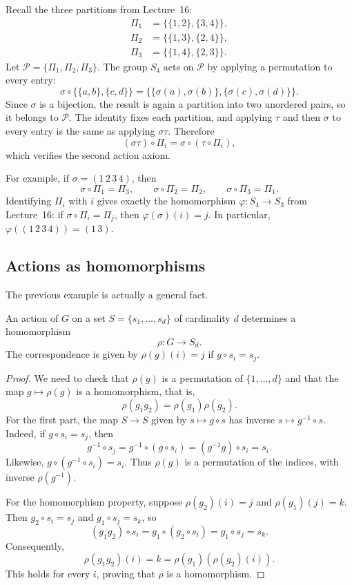 \documentclass[reqno,11pt]{amsart}
\begin{document}
\begin{example}
Recall the three partitions from Lecture~16:
\[
\begin{aligned}
  \Pi_1&=\bigl\{\{1,2\},\{3,4\}\bigr\},\\
  \Pi_2&=\bigl\{\{1,3\},\{2,4\}\bigr\},\\
  \Pi_3&=\bigl\{\{1,4\},\{2,3\}\bigr\}.
\end{aligned}
\]
Let $\mathcal P=\{\Pi_1,\Pi_2,\Pi_3\}$. The group $S_4$ acts on
$\mathcal P$ by applying a permutation to every entry:
\[
  \sigma\circ\bigl\{\{a,b\},\{c,d\}\bigr\}
  =\bigl\{\{\sigma(a),\sigma(b)\},
            \{\sigma(c),\sigma(d)\}\bigr\}.
\]
Since $\sigma$ is a bijection, the result is again a partition into
two unordered pairs, so it belongs to $\mathcal P$.
The identity fixes each partition, and applying $\tau$ and then
$\sigma$ to every entry is the same as applying $\sigma\tau$.
Therefore
\[
  (\sigma\tau)\circ\Pi_i=\sigma\circ(\tau\circ\Pi_i),
\]
which verifies the second action axiom.

For example, if $\sigma=(1\,2\,3\,4)$, then
\[
  \sigma\circ\Pi_1=\Pi_3,\qquad
  \sigma\circ\Pi_2=\Pi_2,\qquad
  \sigma\circ\Pi_3=\Pi_1.
\]
Identifying $\Pi_i$ with $i$ gives exactly the homomorphism
$\varphi:S_4\to S_3$ from Lecture~16: if
$\sigma\circ\Pi_i=\Pi_j$, then $\varphi(\sigma)(i)=j$.
In particular, $\varphi((1\,2\,3\,4))=(1\,3)$.
\end{example}


\subsection{Actions as homomorphisms}

The previous example is actually a general fact.

\begin{proposition}
An action of $G$ on a set $S=\{s_1,\ldots,s_d\}$ of cardinality $d$
determines a homomorphism
\[
  \rho:G\longrightarrow S_d.
\]
The correspondence is given by $\rho(g)(i)=j$ if $g\circ s_i=s_j$.
\end{proposition}
\begin{proof}
We need to check that $\rho(g)$ is a permutation of $\{1,\ldots,d\}$
and that the map $g\mapsto\rho(g)$ is a homomorphism, that is,
\[
  \rho(g_1g_2)=\rho(g_1)\rho(g_2).
\]
For the first part, the map $S\to S$ given by $s\mapsto g\circ s$
has inverse $s\mapsto g^{-1}\circ s$. Indeed, if $g\circ s_i=s_j$, then
\[
  g^{-1}\circ s_j=g^{-1}\circ(g\circ s_i)
  =(g^{-1}g)\circ s_i=s_i.
\]
Likewise, $g\circ(g^{-1}\circ s_i)=s_i$.
Thus $\rho(g)$ is a permutation of the indices, with inverse
$\rho(g^{-1})$.

For the homomorphism property, suppose $\rho(g_2)(i)=j$ and
$\rho(g_1)(j)=k$. Then $g_2\circ s_i=s_j$ and $g_1\circ s_j=s_k$, so
\[
  (g_1g_2)\circ s_i=g_1\circ(g_2\circ s_i)=g_1\circ s_j=s_k.
\]
Consequently,
\[
  \rho(g_1g_2)(i)=k=\rho(g_1)(\rho(g_2)(i)).
\]
This holds for every $i$, proving that $\rho$ is a homomorphism.
\end{proof}
\end{document}
